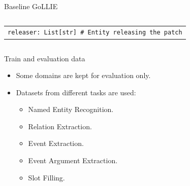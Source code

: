 \documentclass[
    11pt,
    notheorems,
    xcolor={dvipsnames},
    hyperref={
        pdfstartview=FitH, 
        pdftitle={Ikasketa-adibide urriko Informazio-Erauzketa}, 
        pdfauthor={Oscar Sainz Jimenez}, 
        citecolor=secondary, 
    }
]{beamer}
\begin{document}
\begin{frame}
\begin{block}{Baseline \hspace{14.5em}GoLLIE}
\begin{columns}[t]
\begin{column}{0.58\textwidth}
\begin{table}
\begin{tabular}{p{\textwidth}}
                        \texttt{\small\quad releaser: \textcolor{github-dark-red}{List}[str] \textcolor{github-gray}{\# Entity releasing the patch}}      \\
                    \end{tabular}
                \end{table}
            \end{column}
        \end{columns}
    \end{block}

\end{frame}

\begin{frame}
    \begin{columns}[t]
        \begin{column}{0.35\textwidth}
            \begin{block}{Train and evaluation data}
                \begin{itemize}
                    \item Some domains are kept for evaluation only.
                    \item Datasets from different tasks are used:
                    \begin{itemize}
                        \item Named Entity Recognition.
                        \item Relation Extraction.
                        \item Event Extraction.
                        \item Event Argument Extraction.
                        \item Slot Filling.
                    \end{itemize}
                \end{itemize}
            \end{block}
        \end{column}


\end{columns}
\end{frame}
\end{document}
